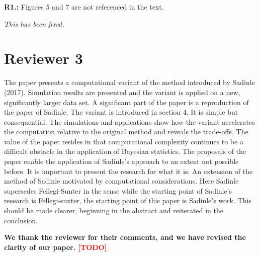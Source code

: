 \documentclass[letterpaper, parskip]{scrartcl}
\newcommand{\pointRaised}[2]{%
	\textbf{#1.\theresponsectr:} #2
}
\newcounter{responsectr}[section]     %
\newcommand{\reply}[1]{%
	\refstepcounter{responsectr}%
		\begin{tcolorbox}
			\itshape #1
		\end{tcolorbox}
}
\newcommand{\todo}{\textcolor{red}{[TODO]}\xspace}
\begin{document}
\pointRaised{R1}{%
	Figures 5 and 7 are not referenced in the text.
}
\reply{%
	This has been fixed.
}



	\clearpage
	\newpage
	
	\section*{Reviewer 3}
	\setcounter{responsectr}{0}

	The paper presents a computational variant of the method introduced by Sadinle (2017). Simulation
	results are presented and the variant is applied on a new, significantly larger data set.
	A significant part of the paper is a reproduction of the paper of Sadinle. The variant is introduced in
	section 4. It is simple but consequential. The simulations and applications show how the variant
	accelerates the computation relative to the original method and reveals the trade-offs.
	The value of the paper resides in that computational complexity continues to be a difficult obstacle in
	the application of Bayesian statistics. The proposals of the paper enable the application of Sadinle’s
	approach to an extent not possible before.
	It is important to present the research for what it is: An extension of the method of Sadinle motivated
	by computational considerations. Here Sadinle supersedes Fellegi-Sunter in the sense while the starting
	point of Sadinle’s research is Fellegi-sunter, the starting point of this paper is Sadinle’s work. This should
	be made clearer, beginning in the abstract and reiterated in the conclusion.
	
	\textbf{We thank the reviewer for their comments, and we have revised the clarity of our paper. \todo}	
	
	
\end{document}
